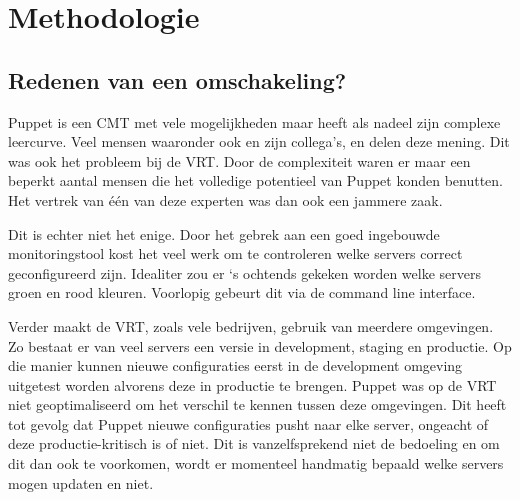 
\chapter{Methodologie}
\label{ch:methodologie}


\section{Redenen van een omschakeling?}
\label{sec:methodologie-redenen-omschakeling}

Puppet is een CMT met vele mogelijkheden maar heeft als nadeel zijn complexe leercurve. Veel mensen waaronder ook \textcite{danAnsiblevsPuppet} en zijn collega's, \textcite{martinAnsiblevsPuppet} en \textcite{AliAnsiblevsPuppet} delen deze mening. Dit was ook het probleem bij de VRT. Door de complexiteit waren er maar een beperkt aantal mensen die het volledige potentieel van Puppet konden benutten. Het vertrek van \'e\'en van deze experten was dan ook een jammere zaak.

Dit is echter niet het enige. Door het gebrek aan een goed ingebouwde monitoringstool kost het veel werk om te controleren welke servers correct geconfigureerd zijn. Idealiter zou er  `s ochtends gekeken worden welke servers groen en rood kleuren. Voorlopig gebeurt dit via de command line interface.  

Verder maakt de VRT, zoals vele bedrijven, gebruik van meerdere omgevingen. Zo bestaat er van veel servers een versie in development, staging en productie. Op die manier kunnen nieuwe configuraties eerst in de development omgeving uitgetest worden alvorens deze in productie te brengen. Puppet was op de VRT niet geoptimaliseerd om het verschil te kennen tussen deze omgevingen. Dit heeft tot gevolg dat Puppet nieuwe configuraties pusht naar elke server, ongeacht of deze productie-kritisch is of niet. Dit is vanzelfsprekend niet de bedoeling en om dit dan ook te voorkomen, wordt er momenteel handmatig bepaald welke servers mogen updaten en niet. 

